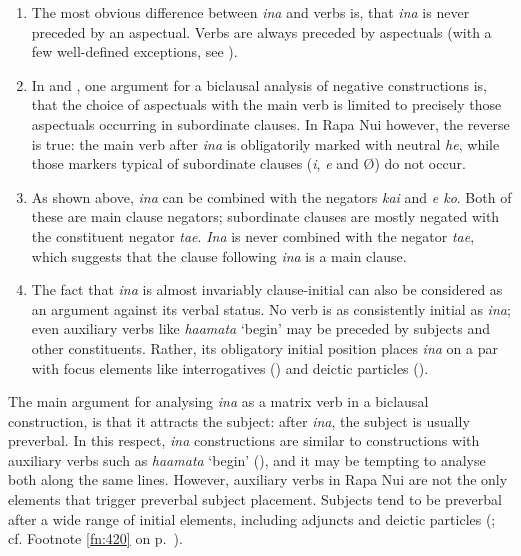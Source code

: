 \begin{enumerate}
\item 
The most obvious difference between \textit{{\ꞌ}ina} and verbs is, that \textit{{\ꞌ}ina} is never preceded by an aspectual. Verbs are always preceded by aspectuals (with a few well-defined exceptions, see ).

\item 
In  and , one argument for a biclausal analysis of negative constructions is, that the choice of aspectuals with the main verb is limited to precisely those aspectuals occurring in subordinate clauses. In Rapa Nui however, the reverse is true: the main verb after \textit{{\ꞌ}ina} is obligatorily marked with neutral \textit{he}, while those markers typical of subordinate clauses (\textit{i}, \textit{e} and Ø) do not occur. 

\item 
As shown above, \textit{{\ꞌ}ina} can be combined with the negators \textit{kai} and \textit{e ko}. Both of these are main clause negators; subordinate clauses are mostly negated with the constituent negator \textit{ta{\ꞌ}e}. \textit{{\ꞌ}Ina} is never combined with the negator \textit{ta{\ꞌ}e}, which suggests that the clause following \textit{{\ꞌ}ina} is a main clause.

\item 
The fact that \textit{{\ꞌ}ina} is almost invariably clause-initial can also be considered as an argument against its verbal status. No verb is as consistently initial as \textit{{\ꞌ}ina}; even auxiliary verbs like \textit{ha{\ꞌ}amata} ‘begin’ may be preceded by subjects and other constituents. Rather, its obligatory initial position places \textit{{\ꞌ}ina} on a par with focus elements like interrogatives () and deictic particles ().

\end{enumerate}

The main argument for analysing \textit{{\ꞌ}ina} as a matrix verb in a biclausal construction, is that it attracts the subject: after \textit{{\ꞌ}ina}, the subject is usually preverbal. In this respect, \textit{{\ꞌ}ina} constructions are similar to constructions with auxiliary verbs such as \textit{ha{\ꞌ}amata} ‘begin’ (), and it may be tempting to analyse both along the same lines. However, auxiliary verbs in Rapa Nui are not the only elements that trigger preverbal subject placement. Subjects tend to be preverbal after a wide range of initial elements, including adjuncts and deictic particles (; cf. Footnote \ref{fn:420} on p.~\pageref{fn:420}). 

